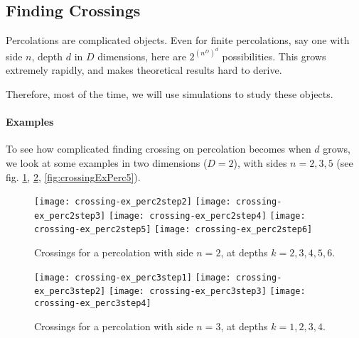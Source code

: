 \subsection{Finding Crossings}
Percolations are complicated objects.
Even for finite percolations, say one with side $n$, depth $d$ in $D$ dimensions, here are $2^{\left( n^D \right)^d}$ possibilities.
This grows extremely rapidly, and makes theoretical results hard to derive.

Therefore, most of the time, we will use simulations to study these objects.

\paragraph{Examples}
To see how complicated finding crossing on percolation becomes when $d$ grows, we look at some examples in two dimensions ($D=2$), with sides $n=2,3,5$ (see fig. \ref{fig:crossingExPerc2}, \ref{fig:crossingExPerc3}, \ref{fig:crossingExPerc5}).
\begin{figure}[!h]
	\texttt{[image: crossing-ex\_perc2step2]}
	\hspace{0.1cm}
	\texttt{[image: crossing-ex\_perc2step3]}
	\hspace{0.1cm}
	\texttt{[image: crossing-ex\_perc2step4]}
	\hspace{0.1cm}
	\texttt{[image: crossing-ex\_perc2step5]}
	\hspace{0.1cm}
	\texttt{[image: crossing-ex\_perc2step6]}
	\centering
	\caption{Crossings for a percolation with side $n=2$, at depths $k=2,3,4,5,6$.}
	\label{fig:crossingExPerc2}
\end{figure}
\begin{figure}[!h]
	\texttt{[image: crossing-ex\_perc3step1]}
	\hspace{0.1cm}
	\texttt{[image: crossing-ex\_perc3step2]}
	\hspace{0.1cm}
	\texttt{[image: crossing-ex\_perc3step3]}
	\hspace{0.1cm}
	\texttt{[image: crossing-ex\_perc3step4]}
	\centering
	\caption{Crossings for a percolation with side $n=3$, at depths $k=1,2,3,4$.}
	\label{fig:crossingExPerc3}
\end{figure}
